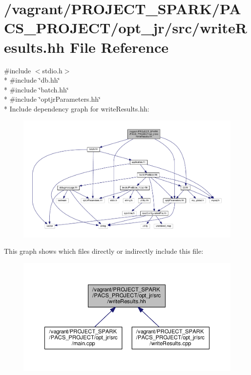 \hypertarget{writeResults_8hh}{\section{/vagrant/\-P\-R\-O\-J\-E\-C\-T\-\_\-\-S\-P\-A\-R\-K/\-P\-A\-C\-S\-\_\-\-P\-R\-O\-J\-E\-C\-T/opt\-\_\-jr/src/write\-Results.hh File Reference}
\label{writeResults_8hh}
}
{\ttfamily \#include $<$stdio.\-h$>$}\\*
{\ttfamily \#include \char`\"{}db.\-hh\char`\"{}}\\*
{\ttfamily \#include \char`\"{}batch.\-hh\char`\"{}}\\*
{\ttfamily \#include \char`\"{}optjr\-Parameters.\-hh\char`\"{}}\\*
Include dependency graph for write\-Results.\-hh\-:
\nopagebreak
\begin{figure}[H]
\begin{center}
\leavevmode
\includegraphics[width=350pt]{writeResults_8hh__incl}
\end{center}
\end{figure}
This graph shows which files directly or indirectly include this file\-:
\nopagebreak
\begin{figure}[H]
\begin{center}
\leavevmode
\includegraphics[width=350pt]{writeResults_8hh__dep__incl}
\end{center}
\end{figure}
